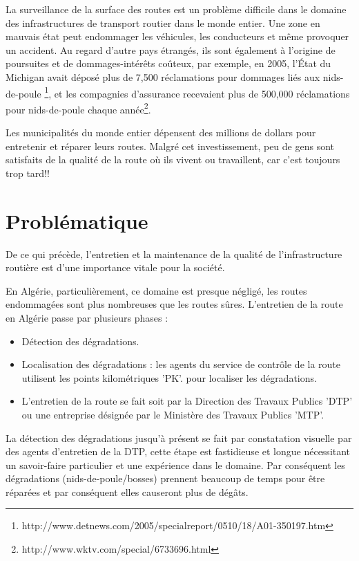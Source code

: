 La surveillance de la surface des routes est un problème difficile dans le domaine des
infrastructures de transport routier dans le monde entier. Une zone en mauvais état peut
endommager les véhicules, les conducteurs et même provoquer un accident.
Au regard d'autre pays étrangés, ils sont également à l'origine de poursuites et de dommages-intérêts coûteux, par exemple,
en 2005, l'État du Michigan avait déposé plus de 7,500 réclamations pour dommages liés
aux nids-de-poule \footnote{http://www.detnews.com/2005/specialreport/0510/18/A01-350197.htm}, et les
compagnies d'assurance recevaient plus de 500,000 réclamations pour nids-de-poule chaque
année\footnote{http://www.wktv.com/special/6733696.html}.

Les municipalités du monde entier dépensent des millions de dollars pour entretenir et réparer leurs routes.
Malgré cet investissement, peu de gens sont satisfaits de la qualité de la route où ils vivent ou travaillent, car c'est  toujours trop tard!!

\section{Problématique}
De ce qui précède, l'entretien et la maintenance de la qualité de l'infrastructure routière est d'une importance vitale pour la société.

En Algérie, particulièrement, ce domaine est presque négligé, les routes endommagées sont plus nombreuses que les routes sûres.
L'entretien de la route en Algérie  passe par plusieurs phases :

\renewcommand{\labelitemi}{$\bullet$}
\begin{itemize}
  \item Détection des dégradations.
  \item Localisation des dégradations : les agents du service de contrôle de la route utilisent les points kilométriques 'PK'. pour localiser les dégradations.
  \item L'entretien de la route se fait soit par la Direction des Travaux Publics 'DTP' ou une entreprise désignée par le Ministère des Travaux Publics 'MTP'.
\end{itemize}

La détection des dégradations jusqu'à présent se fait par constatation visuelle par des agents d'entretien de la DTP, cette étape est fastidieuse et longue nécessitant un savoir-faire particulier et une expérience dans le domaine. Par conséquent les dégradations (nids-de-poule/bosses) prennent beaucoup de temps pour être réparées et par conséquent elles causeront plus de dégâts.

